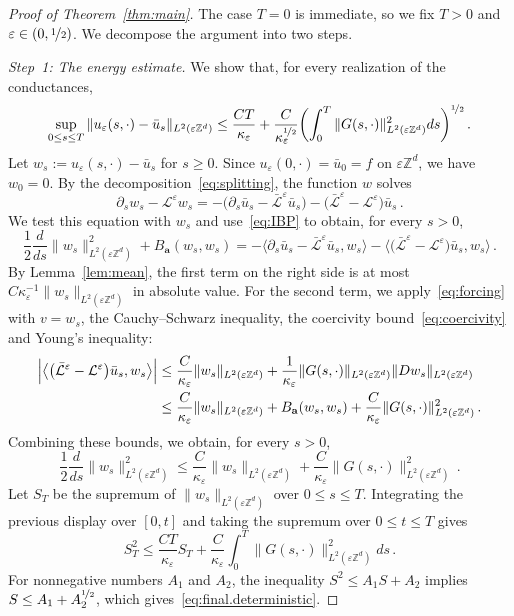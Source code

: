 \documentclass[11pt]{amsart}
\numberwithin{equation}{section}
\newcommand{\Z}{\mathbb{Z}}
\newcommand{\ba}{\mathbf{a}}
\newcommand{\eps}{\varepsilon}
\newcommand{\Leps}{\mathcal{L}^\varepsilon}
\newcommand{\Lbar}{\bar{\mathcal{L}}^\varepsilon}
\newcommand{\nf}{\nicefrac}
\begin{document}
\begin{proof}[Proof of Theorem~\ref{thm:main}]
The case $T = 0$ is immediate, so we fix $T > 0$ and $\eps \in (0, \nf12)$.
We decompose the argument into two steps.

\smallskip

\emph{Step~1: The energy estimate.}
We show that, for every realization of the conductances,
\begin{equation} \label{eq:final.deterministic}
    \sup_{0 \leq s \leq T} \|u_\eps(s, \cdot) - \bar u_s\|_{L^2(\eps \Z^d)} \leq \frac{C T}{\kappa_\eps} + \frac{C}{\kappa_\eps^{\nf12}} \biggl( \int_0^T \|G(s, \cdot)\|_{L^2(\eps \Z^d)}^2 ds \biggr)^{\nf12}\,.
\end{equation}
Let $w_s := u_\eps(s, \cdot) - \bar u_s$ for $s \geq 0$.
Since $u_\eps(0, \cdot) = \bar u_0 = f$ on $\eps \Z^d$, we have $w_0 = 0$.
By the decomposition~\eqref{eq:splitting}, the function $w$ solves
\begin{equation*}
    \partial_s w_s - \Leps w_s = - \bigl( \partial_s \bar u_s - \Lbar \bar u_s \bigr) - \bigl( \Lbar - \Leps \bigr) \bar u_s\,.
\end{equation*}
We test this equation with $w_s$ and use~\eqref{eq:IBP} to obtain, for every $s > 0$,
\begin{equation*}
    \frac12 \frac{d}{ds} \|w_s\|_{L^2(\eps \Z^d)}^2 + B_\ba(w_s, w_s) = - \bigl\langle \partial_s \bar u_s - \Lbar \bar u_s, w_s \bigr\rangle - \bigl\langle \bigl( \Lbar - \Leps \bigr) \bar u_s, w_s \bigr\rangle\,.
\end{equation*}
By Lemma~\ref{lem:mean}, the first term on the right side is at most $C \kappa_\eps^{-1} \|w_s\|_{L^2(\eps \Z^d)}$ in absolute value.
For the second term, we apply~\eqref{eq:forcing} with $v = w_s$, the Cauchy--Schwarz inequality, the coercivity bound~\eqref{eq:coercivity} and Young's inequality:
\begin{align*}
    \Bigl| \bigl\langle \bigl( \Lbar - \Leps \bigr) \bar u_s, w_s \bigr\rangle \Bigr|
    & \leq \frac{C}{\kappa_\eps} \|w_s\|_{L^2(\eps \Z^d)} + \frac{1}{\kappa_\eps} \|G(s, \cdot)\|_{L^2(\eps \Z^d)} \|D w_s\|_{L^2(\eps \Z^d)} \\
    & \leq \frac{C}{\kappa_\eps} \|w_s\|_{L^2(\eps \Z^d)} + B_\ba(w_s, w_s) + \frac{C}{\kappa_\eps} \|G(s, \cdot)\|_{L^2(\eps \Z^d)}^2\,.
\end{align*}
Combining these bounds, we obtain, for every $s > 0$,
\begin{equation*}
    \frac12 \frac{d}{ds} \|w_s\|_{L^2(\eps \Z^d)}^2 \leq \frac{C}{\kappa_\eps} \|w_s\|_{L^2(\eps \Z^d)} + \frac{C}{\kappa_\eps} \|G(s, \cdot)\|_{L^2(\eps \Z^d)}^2\,.
\end{equation*}
Let $S_T$ be the supremum of $\|w_s\|_{L^2(\eps \Z^d)}$ over $0 \leq s \leq T$.
Integrating the previous display over $[0,t]$ and taking the supremum over $0 \leq t \leq T$ gives
\begin{equation*}
    S_T^2 \leq \frac{C T}{\kappa_\eps} S_T + \frac{C}{\kappa_\eps} \int_0^T \|G(s, \cdot)\|_{L^2(\eps \Z^d)}^2 ds\,.
\end{equation*}
For nonnegative numbers $A_1$ and $A_2$, the inequality $S^2 \leq A_1 S + A_2$ implies $S \leq A_1 + A_2^{\nf12}$, which gives~\eqref{eq:final.deterministic}.


\end{proof}
\end{document}
